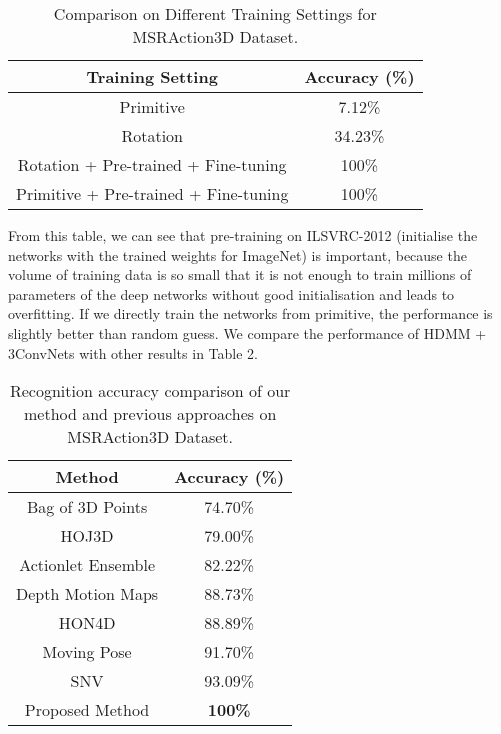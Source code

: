 \documentclass[conference]{IEEEtran}
\begin{document}
\begin{table}[h]
\centering
\caption{Comparison on Different Training Settings for MSRAction3D Dataset.}
\begin{tabular}{|c|c|}
\hline
Training Setting & Accuracy (\%)\\
\hline
Primitive & 7.12\%  \\
\hline
Rotation &34.23\%\\
\hline
Rotation + Pre-trained + Fine-tuning & 100\%  \\
\hline
Primitive + Pre-trained + Fine-tuning & 100\%  \\
\hline
\end{tabular}
\end{table} 
From this table, we can see that pre-training on ILSVRC-2012 (initialise the networks with the trained weights for ImageNet) is important, because the volume of training data is so small that it is not enough to train millions of parameters of the deep networks without good initialisation and leads to overfitting. If we directly train the networks from primitive, the performance is slightly better than random guess.
We compare the performance of HDMM + 3ConvNets with other results in Table 2.

\begin{table}[h]
\centering
\caption{Recognition accuracy comparison of our method and previous approaches on MSRAction3D Dataset.}
\begin{tabular}{|c|c|}
\hline
Method & Accuracy (\%)\\
\hline
Bag of 3D Points \cite{Li2010} & 74.70\%  \\
\hline
HOJ3D \cite{xia2012view} & 79.00\%\\
\hline
Actionlet Ensemble \cite{wang2012mining} & 82.22\%  \\
\hline
Depth Motion Maps \cite{Yang2012a} & 88.73\%  \\
\hline
HON4D \cite{wang2012mining} & 88.89\%  \\
\hline
Moving Pose \cite{zanfir2013moving} & 91.70\%  \\
\hline
SNV \cite{yangsuper} & 93.09\%  \\
\hline
Proposed Method & \textbf{100\%}  \\
\hline
\end{tabular}
\end{table}
\end{document}
